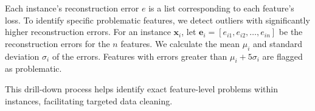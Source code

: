 


Each instance's reconstruction error \( e \) is a list corresponding to each feature's loss. To identify specific problematic features, we detect outliers with significantly higher reconstruction errors.
For an instance \( \mathbf{x}_i \), let \( \mathbf{e}_i = [e_{i1}, e_{i2}, \ldots, e_{in}] \) be the reconstruction errors for the \( n \) features. We calculate the mean \( \mu_i \) and standard deviation \( \sigma_i \) of the errors. Features with errors greater than \( \mu_i + 5\sigma_i \) are flagged as problematic.

This drill-down process helps identify exact feature-level problems within instances, facilitating targeted data cleaning.






